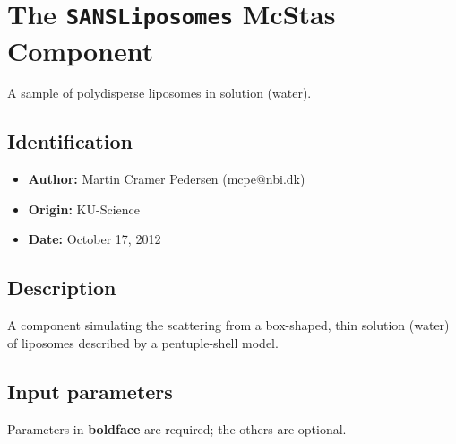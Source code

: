 \section{The \texttt{SANSLiposomes} McStas Component}
A sample of polydisperse liposomes in solution (water).

\subsection*{Identification}
\begin{itemize}
  \item \textbf{Author:} Martin Cramer Pedersen (mcpe@nbi.dk)
  \item \textbf{Origin:} KU-Science
  \item \textbf{Date:} October 17, 2012
\end{itemize}

\subsection*{Description}
A component simulating the scattering from a box-shaped, thin solution (water) of liposomes described by a pentuple-shell model.

\subsection*{Input parameters}
Parameters in \textbf{boldface} are required; the others are optional.

